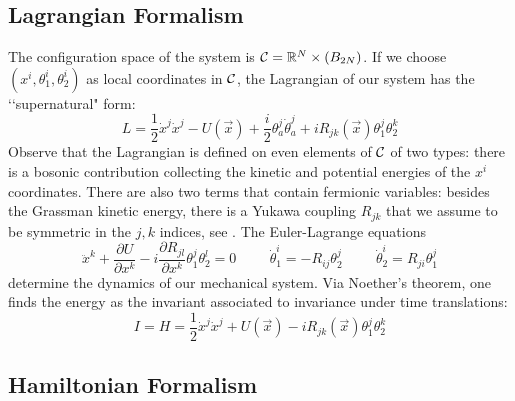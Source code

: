 \documentclass[a4paper,11pt,twoside]{article}
\def\r{\mathbb R}                   %
\begin{document}
\subsection{Lagrangian Formalism}

The configuration space of the system is ${\cal C}={\r}^N \times
(B_{2N})$. If we choose $(x^i,\theta_1^i,\theta_2^i)$ as local
coordinates in ${\cal C}$, the Lagrangian of our system has the
\lq\lq supernatural" form:
\[
L=\displaystyle\frac{1}{2} \dot{x}^j \dot{x}^j
-U(\vec{x})+\displaystyle\frac{i}{2} \theta^j_a \dot{\theta}^j_a+
i R_{jk}(\vec{x}) \theta^j_1 \theta^k_2
\]
Observe that the Lagrangian is defined on even elements of ${\cal
C}$ of two types: there is a bosonic contribution collecting the
kinetic and potential energies of the $x^i$ coordinates. There are
also two terms that contain fermionic variables: besides the
Grassman kinetic energy, there is a Yukawa coupling $R_{jk}$ that
we assume to be symmetric in the $j,k$ indices, see \cite{Ca}. The
Euler-Lagrange equations
\[
\ddot{x}^k+\frac{\partial U}{\partial x^k}-i \frac{\partial
R_{jl}}{\partial x^k} \theta_1^j \theta_2^l=0 \hspace{1cm}
\dot{\theta}_1^i=-R_{ij} \theta_2^j \hspace{1cm}
\dot{\theta}_2^i=R_{ji} \theta_1^j
\]
determine the dynamics of our mechanical system. Via Noether's
theorem, one finds the energy as the invariant associated to
invariance under time translations:
\begin{equation}
I=H=\frac{1}{2} \dot{x}^j \dot{x}^j +U(\vec{x})- i R_{jk}(\vec{x})
\theta^j_1 \theta^k_2
\label{eq:hapseudo}
\end{equation}

\subsection{Hamiltonian Formalism}
\end{document}
